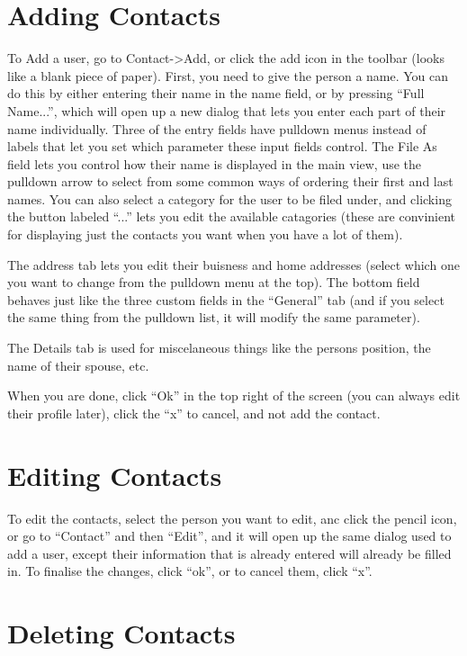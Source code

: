\documentclass[12pt,letterpaper,oneside, openany]{book} \usepackage[latin1] {inputenc}
\begin{document}
\section{Adding Contacts}

To Add a user, go to Contact->Add, or click the add icon in the toolbar (looks like a blank piece of paper). First, you need to give the person a name. You can do this by either entering their name in the name field, or by pressing ``Full Name...'', which will open up a new dialog that lets you enter each part of their name individually. Three of the entry fields have pulldown menus instead of labels that let you set which parameter these input fields control. The File As field lets you control how their name is displayed in the main view, use the pulldown arrow to select from some common ways of ordering their first and last names. You can also select a category for the user to be filed under, and clicking the button labeled ``...'' lets you edit the available catagories (these are convinient for displaying just the contacts you want when you have a lot of them). 

The address tab lets you edit their buisness and home addresses (select which one you want to change from the pulldown menu at the top). The bottom field behaves just like the three custom fields in the ``General'' tab (and if you select the same thing from the pulldown list, it will modify the same parameter). 

The Details tab is used for miscelaneous things like the persons position, the name of their spouse, etc. 

When you are done, click ``Ok'' in the top right of the screen (you can always edit their profile later), click the ``x'' to cancel, and not add the contact. 

\section{Editing Contacts}

To edit the contacts, select the person you want to edit, anc click the pencil icon, or go to ``Contact'' and then ``Edit'', and it will open up the same dialog used to add a user, except their information that is already entered will already be filled in. To finalise the changes, click ``ok'', or to cancel them, click ``x''. 

\section{Deleting Contacts}
\end{document}
